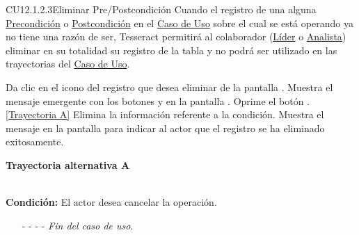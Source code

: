 	\begin{UseCase}{CU12.1.2.3}{Eliminar Pre/Postcondición}{
			Cuando el registro de una  alguna \hyperlink{entidadPrecondicion}{Precondición} o \hyperlink{entidadPostcondicion}{Postcondición} en el \hyperlink{casoUso}{Caso de Uso} sobre el cual se está operando ya no tiene una razón de ser, Tesseract permitirá al colaborador (\hyperlink{jefe}{Líder} o \hyperlink{analista}{Analista}) eliminar en su totalidad su registro de la tabla y no podrá ser utilizado en las trayectorias del \hyperlink{casoUso}{Caso de Uso}.
	}
\end{UseCase}
\begin{UCtrayectoria}
	\UCpaso[\UCactor] Da clic en el icono \eliminar del registro que desea eliminar de la pantalla .
	\UCpaso[\UCsist] Muestra el mensaje emergente  con los botones  y  en la pantalla .
	\UCpaso[\UCactor] Oprime el botón . \hyperlink{CU12-1-2-3:TAA}{[Trayectoria A]}
	\UCpaso[\UCsist] Elimina la información referente a la condición.
	\UCpaso[\UCsist] Muestra el mensaje  en la pantalla  para indicar al actor que el registro se ha eliminado exitosamente.
\end{UCtrayectoria}		
\hypertarget{CU12-1-2-3:TAA}{\textbf{Trayectoria alternativa A}}\\
\noindent \textbf{Condición:} El actor desea cancelar la operación.
\begin{enumerate}
	\UCpaso[\UCactor] Solicita cancelar la operación oprimiendo el botón  de la ventana emergente.
	\UCpaso[\UCsist] Muestra la pantalla .
	\item[- -] - - {\em {Fin del caso de uso}}.%
\end{enumerate}



